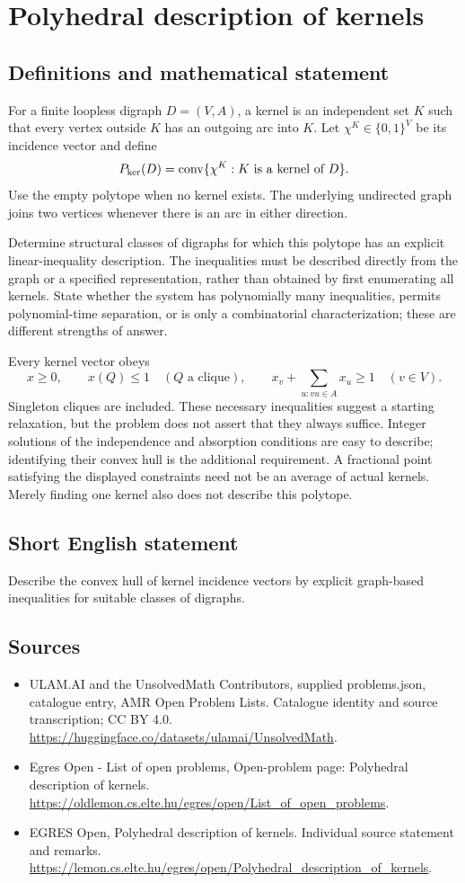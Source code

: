 \documentclass[11pt,a4paper]{article}
\begin{document}
\section*{Polyhedral description of kernels}\label{statement}

\subsection{Definitions and mathematical statement}
For a finite loopless digraph $D=(V,A)$, a kernel is an independent
set $K$ such that every vertex outside $K$ has an outgoing arc into
$K$. Let $\chi^K\in\{0,1\}^V$ be its incidence vector and define
\[
 P_{\rm ker}(D)=\operatorname{conv}\{\chi^K:K\text{ is a kernel of }D\}.
\]
Use the empty polytope when no kernel exists. The underlying undirected
graph joins two vertices whenever there is an arc in either direction.

Determine structural classes of digraphs for which this polytope has
an explicit linear-inequality description. The inequalities must be
described directly from the graph or a specified representation,
rather than obtained by first enumerating all kernels. State whether
the system has polynomially many inequalities, permits polynomial-time
separation, or is only a combinatorial characterization; these are
different strengths of answer.

Every kernel vector obeys
\[
 x\ge0,\qquad x(Q)\le1\quad(Q\text{ a clique}),\qquad
 x_v+\sum_{u:vu\in A}x_u\ge1\quad(v\in V).
\]
Singleton cliques are included. These necessary inequalities suggest
a starting relaxation, but the problem does not assert that they
always suffice. Integer solutions of the independence and absorption
conditions are easy to describe; identifying their convex hull is the
additional requirement. A fractional point satisfying the displayed
constraints need not be an average of actual kernels. Merely finding
one kernel also does not describe this polytope.
\subsection{Short English statement}
Describe the convex hull of kernel incidence vectors by explicit graph-based inequalities for suitable classes of digraphs.
\subsection{Sources}
\begin{itemize}
\item[S1] ULAM.AI and the UnsolvedMath Contributors, supplied problems.json, catalogue entry, AMR Open Problem Lists. Catalogue identity and source transcription; CC BY 4.0.
\url{https://huggingface.co/datasets/ulamai/UnsolvedMath}.
\item[S2] Egres Open - List of open problems, Open-problem page: Polyhedral description of kernels. 
\url{https://oldlemon.cs.elte.hu/egres/open/List_of_open_problems}.
\item[S3] EGRES Open, Polyhedral description of kernels. Individual source statement and remarks.
\url{https://lemon.cs.elte.hu/egres/open/Polyhedral_description_of_kernels}.
\end{itemize}
\end{document}
